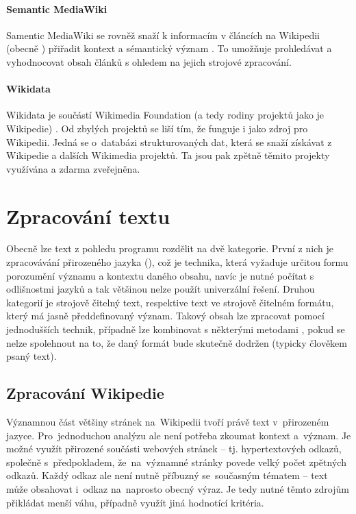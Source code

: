 \subsubsection{Semantic MediaWiki}
Samentic MediaWiki se rovněž snaží k informacím v článcích na Wikipedii (obecně ) přiřadit kontext a sémantický význam \cite{semanticwiki}. To umožňuje prohledávat a vyhodnocovat obsah článků s ohledem na jejich strojové zpracování.
\subsubsection{Wikidata}
Wikidata je součástí Wikimedia Foundation (a tedy rodiny projektů jako je Wikipedie) \cite{wikidata}. Od zbylých projektů se liší tím, že funguje i jako zdroj pro Wikipedii. Jedná se o~databázi strukturovaných dat, která se snaží získávat z Wikipedie a dalších Wikimedia projektů. Ta jsou pak zpětně těmito projekty využívána a zdarma zveřejněna.
 
 
 
 
\chapter{Zpracování textu}
Obecně lze text z pohledu programu rozdělit na dvě kategorie. První z nich je zpracovávání přirozeného jazyka (), což je technika, která vyžaduje určitou formu porozumění významu a kontextu daného obsahu, navíc je nutné počítat s odlišnostmi jazyků a tak většinou nelze použít univerzální řešení. Druhou kategorií je strojově čitelný text, respektive text ve strojově čitelném formátu, který má jasně předdefinovaný význam. Takový obsah lze zpracovat pomocí jednodušších technik, případně lze kombinovat s některými metodami , pokud se nelze spolehnout na to, že daný formát bude skutečně dodržen (typicky člověkem psaný text).

\section {Zpracování Wikipedie}
Významnou část většiny stránek na~Wikipedii tvoří právě text v~přirozeném jazyce. Pro~jednoduchou analýzu ale není potřeba zkoumat kontext a~význam. Je možné využít přirozené součásti webových stránek -- tj. hypertextových odkazů, společně s~předpokladem, že~na~významné stránky povede velký počet zpětných odkazů. Každý odkaz ale není nutně příbuzný se~současným tématem -- text může obsahovat i~odkaz na~naprosto obecný výraz. Je tedy nutné těmto zdrojům přikládat menší váhu, případně využít jiná hodnotící kritéria.


